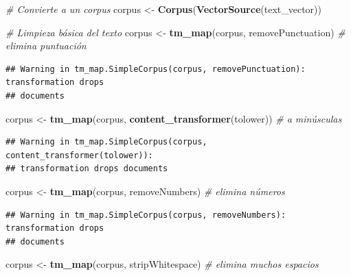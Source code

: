 \documentclass[
]{article}
\newenvironment{Shaded}{\begin{snugshade}}{\end{snugshade}}
\newcommand{\CommentTok}[1]{\textcolor[rgb]{0.56,0.35,0.01}{\textit{#1}}}
\newcommand{\FunctionTok}[1]{\textcolor[rgb]{0.13,0.29,0.53}{\textbf{#1}}}
\newcommand{\NormalTok}[1]{#1}
\newcommand{\OtherTok}[1]{\textcolor[rgb]{0.56,0.35,0.01}{#1}}
\begin{document}
\begin{Shaded}
\begin{Highlighting}[]
\CommentTok{\# Convierte a un corpus}
\NormalTok{corpus }\OtherTok{\textless{}{-}} \FunctionTok{Corpus}\NormalTok{(}\FunctionTok{VectorSource}\NormalTok{(text\_vector))}

\CommentTok{\# Limpieza básica del texto}
\NormalTok{corpus }\OtherTok{\textless{}{-}} \FunctionTok{tm\_map}\NormalTok{(corpus, removePunctuation)                    }\CommentTok{\# elimina puntuación}
\end{Highlighting}
\end{Shaded}

\begin{verbatim}
## Warning in tm_map.SimpleCorpus(corpus, removePunctuation): transformation drops
## documents
\end{verbatim}

\begin{Shaded}
\begin{Highlighting}[]
\NormalTok{corpus }\OtherTok{\textless{}{-}} \FunctionTok{tm\_map}\NormalTok{(corpus, }\FunctionTok{content\_transformer}\NormalTok{(tolower))         }\CommentTok{\# a minúsculas}
\end{Highlighting}
\end{Shaded}

\begin{verbatim}
## Warning in tm_map.SimpleCorpus(corpus, content_transformer(tolower)):
## transformation drops documents
\end{verbatim}

\begin{Shaded}
\begin{Highlighting}[]
\NormalTok{corpus }\OtherTok{\textless{}{-}} \FunctionTok{tm\_map}\NormalTok{(corpus, removeNumbers)                        }\CommentTok{\# elimina números}
\end{Highlighting}
\end{Shaded}

\begin{verbatim}
## Warning in tm_map.SimpleCorpus(corpus, removeNumbers): transformation drops
## documents
\end{verbatim}

\begin{Shaded}
\begin{Highlighting}[]
\NormalTok{corpus }\OtherTok{\textless{}{-}} \FunctionTok{tm\_map}\NormalTok{(corpus, stripWhitespace)                      }\CommentTok{\# elimina muchos espacios}
\end{Highlighting}
\end{Shaded}
\end{document}
